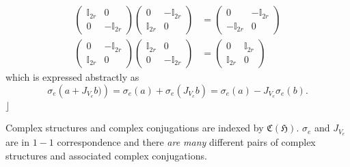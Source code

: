 \documentclass[aps,preprint]{revtex4}
\begin{document}
\begin{align}
\left( 
\begin{array}{cc}
\mathbb{I}_{2r} & 0 \\ 
0 & -\mathbb{I}_{2r}%
\end{array}
\right) \left( 
\begin{array}{cc}
0 & -\mathbb{I}_{2r} \\ 
\mathbb{I}_{2r} & 0%
\end{array}
\right) & =\left( 
\begin{array}{cc}
0 & -\mathbb{I}_{2r} \\ 
-\mathbb{I}_{2r} & 0%
\end{array}
\right) \\
\left( 
\begin{array}{cc}
0 & -\mathbb{I}_{2r} \\ 
\mathbb{I}_{2r} & 0%
\end{array}
\right) \left( 
\begin{array}{cc}
\mathbb{I}_{2r} & 0 \\ 
0 & -\mathbb{I}_{2r}%
\end{array}
\right) & =\left( 
\begin{array}{cc}
0 & \mathbb{I}_{2r} \\ 
\mathbb{I}_{2r} & 0%
\end{array}
\right)
\end{align}
which is expressed abstractly as 
\begin{equation}
\sigma_{e}\left( a+J_{V_{e}}b)\right) =\sigma_{e}\left( a\right)
+\sigma_{e}\left( J_{V_{e}}b\right) =\sigma_{e}\left( a\right)
-J_{V_{e}}\sigma_{e}\left( b\right) .
\end{equation}
$\rfloor$

Complex structures and complex conjugations are indexed by $\mathfrak{C}%
\left( \mathfrak{H}\right) $. $\sigma_{e}$ and $J_{V_{e}}$ are in $1-1$
correspondence and there \emph{are many} different pairs of complex
structures and associated complex conjugations.
\end{document}
